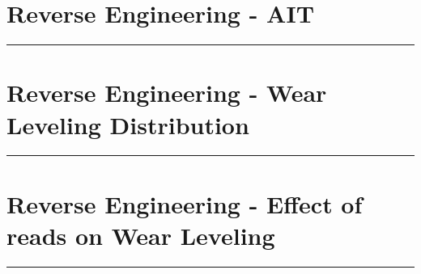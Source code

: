 \documentclass[letterpaper,twocolumn,10pt]{article}
\begin{document}
\begin{minipage}{\linewidth}
\section*{Reverse Engineering - AIT}
\begin{figure}[H]
\centering
\begin{subfigure}[b]{0.52\hsize}
\adjustbox{}{}
\end{subfigure}
\begin{subfigure}[b]{0.45\hsize}
\adjustbox{}{}
\end{subfigure}
\label{fig:ait_reverse}
\end{figure}
\hrule
\end{minipage}

\begin{minipage}{\linewidth}
\section*{Reverse Engineering - Wear Leveling Distribution}
\begin{figure}[H]
{}
\label{fig:wear_leveling_timing}
\end{figure}
\hrule
\end{minipage}


\begin{minipage}{\linewidth}
\section*{Reverse Engineering - Effect of reads on Wear Leveling}
\begin{figure}[H]
\centering

\label{fig:wear-leveling-readwrite}
\end{figure}
\hrule
\end{minipage}
\end{document}
